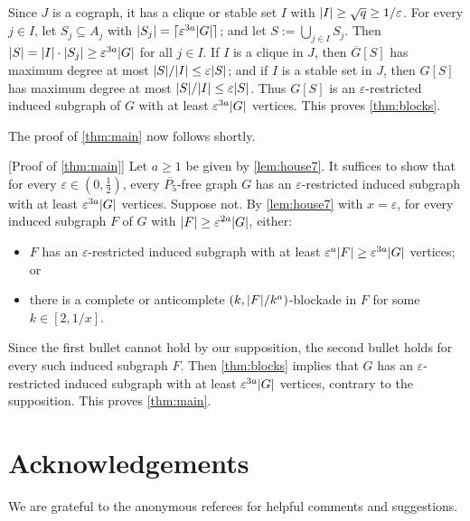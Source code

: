 \documentclass[11pt,reqno,a4paper]{amsart}
\let\oldendproof\endproof
\renewenvironment{proof}[1][\proofname]{%
	\oldproof[\normalfont\bfseries #1]%
}{\oldendproof}
\newcommand{\eps}{\varepsilon}
\renewcommand{\subset}{\subseteq}
\DeclarePairedDelimiter\abs{\lvert}{\rvert}%
\DeclarePairedDelimiter\ceil{\lceil}{\rceil}%
\begin{document}
\begin{proof}
		Since $J$ is a cograph, it has a clique or stable set $I$ with $\abs I\ge\sqrt q\ge1/\eps$.
		For every $j\in I$, let $S_j\subset A_j$ with $\abs{S_j}=\ceil{\eps^{3a}\abs G}$;
		and let $S:=\bigcup_{j\in I}S_j$.
		Then $\abs S=\abs I\cdot\abs{S_j}\ge \eps^{3a}\abs G$ for all $j\in I$.
		If $I$ is a clique in $J$, then $\overline G[S]$ has maximum degree at most $\abs S/\abs I\le\eps\abs S$;
		and if $I$ is a stable set in $J$, then $G[S]$ has maximum degree at most $\abs S/\abs I\le\eps\abs S$.
		Thus $G[S]$ is an $\eps$-restricted induced subgraph of $G$ with at least $\eps^{3a}\abs G$ vertices.
		This proves \cref{thm:blocks}.
	\end{proof}
	
	The proof of \cref{thm:main} now follows shortly.
	\begin{proof}
		[Proof of \cref{thm:main}]
		Let $a\ge1$ be given by \cref{lem:house7}.
		It suffices to show that for every $\eps\in(0,\frac12)$, every $\overline{P_5}$-free graph $G$ has an $\eps$-restricted induced subgraph with at least $\eps^{3a}\abs G$ vertices.
		Suppose not.
		By \cref{lem:house7} with $x=\eps$,
		for every induced subgraph $F$ of $G$ with $\abs F\ge \eps^{2a}\abs G$, either:
		\begin{itemize}
			\item $F$ has an $\eps$-restricted induced subgraph with at least $\eps^{a}\abs F\ge\eps^{3a}\abs G$ vertices; or
			
			\item there is a complete or anticomplete $(k,\abs F/k^a)$-blockade in $F$ for some $k\in[2,1/x]$.
		\end{itemize}
		
		Since the first bullet cannot hold by our supposition, the second bullet holds for every such induced subgraph $F$.
		Then \cref{thm:blocks} implies that $G$ has an $\eps$-restricted induced subgraph with at least $\eps^{3a}\abs G$ vertices, contrary to the supposition.
		This proves \cref{thm:main}.
	\end{proof}
	\section*{Acknowledgements}
	We are grateful to the anonymous referees for helpful comments and suggestions.
	
\end{document}
